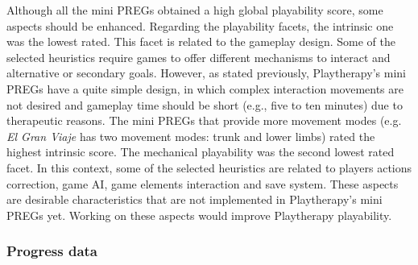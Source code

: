 \begin{table}[bth]
\caption{Percentage of mini \acp{PREG} that obtained each score for the playability attributes}
\myfloatalign
{}
\label{tab:percentage_attributes}
\end{table}

Although all the mini \acp{PREG} obtained a high global playability score, some aspects should be enhanced. Regarding the playability facets, the intrinsic one was the lowest rated. This facet is related to the gameplay design. Some of the selected heuristics require games to offer different mechanisms to interact and alternative or secondary goals. However, as stated previously, Playtherapy's mini \acp{PREG} have a quite simple design, in which complex interaction movements are not desired and gameplay time should be short (e.g., five to ten minutes) due to therapeutic reasons. The mini \acp{PREG} that provide more movement modes (e.g. \textit{El Gran Viaje} has two movement modes: trunk and lower limbs) rated the highest intrinsic score. The mechanical playability was the second lowest rated facet. In this context, some of the selected heuristics are related to players actions correction, game \ac{AI}, game elements interaction and save system. These aspects are desirable characteristics that are not implemented in Playtherapy's mini \acp{PREG} yet. Working on these aspects would improve Playtherapy playability.

\subsubsection{Progress data}

